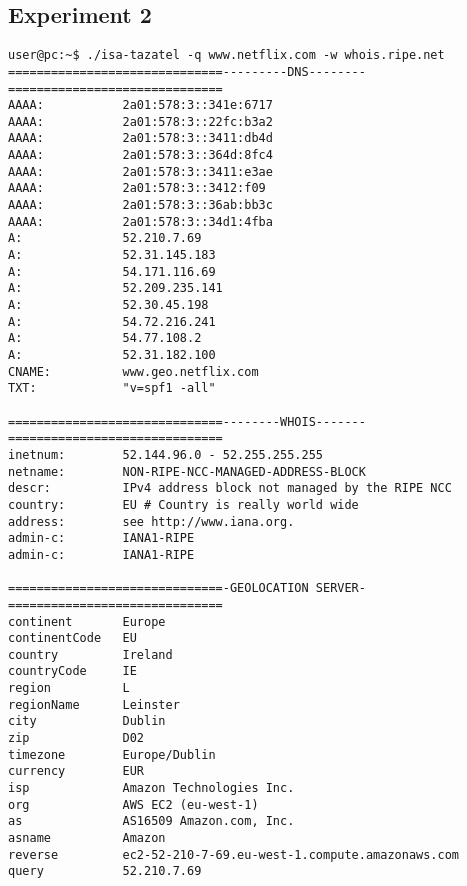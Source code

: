 \documentclass[a4paper, 11pt]{article}
\begin{document}
\subsection{Experiment 2}\label{experiment_2}
\begin{lstlisting}[caption={Výsledok dotazu nad doménov \textbf{www.netflix.com}.}, label={test_app_2}]
user@pc:~$ ./isa-tazatel -q www.netflix.com -w whois.ripe.net
==============================---------DNS--------==============================
AAAA:           2a01:578:3::341e:6717
AAAA:           2a01:578:3::22fc:b3a2
AAAA:           2a01:578:3::3411:db4d
AAAA:           2a01:578:3::364d:8fc4
AAAA:           2a01:578:3::3411:e3ae
AAAA:           2a01:578:3::3412:f09
AAAA:           2a01:578:3::36ab:bb3c
AAAA:           2a01:578:3::34d1:4fba
A:              52.210.7.69
A:              52.31.145.183
A:              54.171.116.69
A:              52.209.235.141
A:              52.30.45.198
A:              54.72.216.241
A:              54.77.108.2
A:              52.31.182.100
CNAME:          www.geo.netflix.com
TXT:            "v=spf1 -all"

==============================--------WHOIS-------==============================
inetnum:        52.144.96.0 - 52.255.255.255
netname:        NON-RIPE-NCC-MANAGED-ADDRESS-BLOCK
descr:          IPv4 address block not managed by the RIPE NCC
country:        EU # Country is really world wide
address:        see http://www.iana.org.
admin-c:        IANA1-RIPE
admin-c:        IANA1-RIPE

==============================-GEOLOCATION SERVER-==============================
continent       Europe
continentCode   EU
country         Ireland
countryCode     IE
region          L
regionName      Leinster
city            Dublin
zip             D02
timezone        Europe/Dublin
currency        EUR
isp             Amazon Technologies Inc.
org             AWS EC2 (eu-west-1)
as              AS16509 Amazon.com, Inc.
asname          Amazon
reverse         ec2-52-210-7-69.eu-west-1.compute.amazonaws.com
query           52.210.7.69
\end{lstlisting}
\end{document}
